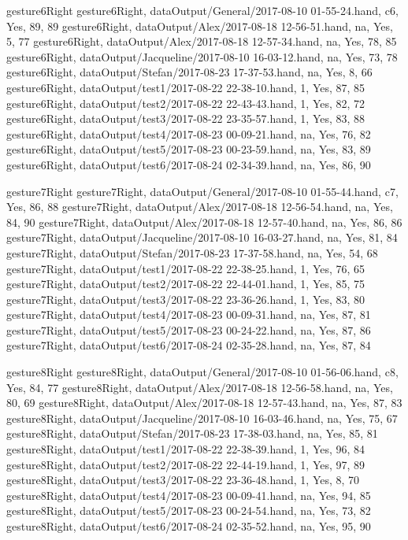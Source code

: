 gesture6Right
gesture6Right, dataOutput/General/2017-08-10 01-55-24.hand, c6, Yes, 89, 89
gesture6Right, dataOutput/Alex/2017-08-18 12-56-51.hand, na, Yes, 5, 77
gesture6Right, dataOutput/Alex/2017-08-18 12-57-34.hand, na, Yes, 78, 85
gesture6Right, dataOutput/Jacqueline/2017-08-10 16-03-12.hand, na, Yes, 73, 78
gesture6Right, dataOutput/Stefan/2017-08-23 17-37-53.hand, na, Yes, 8, 66
gesture6Right, dataOutput/test1/2017-08-22 22-38-10.hand, 1, Yes, 87, 85
gesture6Right, dataOutput/test2/2017-08-22 22-43-43.hand, 1, Yes, 82, 72
gesture6Right, dataOutput/test3/2017-08-22 23-35-57.hand, 1, Yes, 83, 88
gesture6Right, dataOutput/test4/2017-08-23 00-09-21.hand, na, Yes, 76, 82
gesture6Right, dataOutput/test5/2017-08-23 00-23-59.hand, na, Yes, 83, 89
gesture6Right, dataOutput/test6/2017-08-24 02-34-39.hand, na, Yes, 86, 90

gesture7Right
gesture7Right, dataOutput/General/2017-08-10 01-55-44.hand, c7, Yes, 86, 88
gesture7Right, dataOutput/Alex/2017-08-18 12-56-54.hand, na, Yes, 84, 90
gesture7Right, dataOutput/Alex/2017-08-18 12-57-40.hand, na, Yes, 86, 86
gesture7Right, dataOutput/Jacqueline/2017-08-10 16-03-27.hand, na, Yes, 81, 84
gesture7Right, dataOutput/Stefan/2017-08-23 17-37-58.hand, na, Yes, 54, 68
gesture7Right, dataOutput/test1/2017-08-22 22-38-25.hand, 1, Yes, 76, 65
gesture7Right, dataOutput/test2/2017-08-22 22-44-01.hand, 1, Yes, 85, 75
gesture7Right, dataOutput/test3/2017-08-22 23-36-26.hand, 1, Yes, 83, 80
gesture7Right, dataOutput/test4/2017-08-23 00-09-31.hand, na, Yes, 87, 81
gesture7Right, dataOutput/test5/2017-08-23 00-24-22.hand, na, Yes, 87, 86
gesture7Right, dataOutput/test6/2017-08-24 02-35-28.hand, na, Yes, 87, 84

gesture8Right
gesture8Right, dataOutput/General/2017-08-10 01-56-06.hand, c8, Yes, 84, 77
gesture8Right, dataOutput/Alex/2017-08-18 12-56-58.hand, na, Yes, 80, 69
gesture8Right, dataOutput/Alex/2017-08-18 12-57-43.hand, na, Yes, 87, 83
gesture8Right, dataOutput/Jacqueline/2017-08-10 16-03-46.hand, na, Yes, 75, 67
gesture8Right, dataOutput/Stefan/2017-08-23 17-38-03.hand, na, Yes, 85, 81
gesture8Right, dataOutput/test1/2017-08-22 22-38-39.hand, 1, Yes, 96, 84
gesture8Right, dataOutput/test2/2017-08-22 22-44-19.hand, 1, Yes, 97, 89
gesture8Right, dataOutput/test3/2017-08-22 23-36-48.hand, 1, Yes, 8, 70
gesture8Right, dataOutput/test4/2017-08-23 00-09-41.hand, na, Yes, 94, 85
gesture8Right, dataOutput/test5/2017-08-23 00-24-54.hand, na, Yes, 73, 82
gesture8Right, dataOutput/test6/2017-08-24 02-35-52.hand, na, Yes, 95, 90

